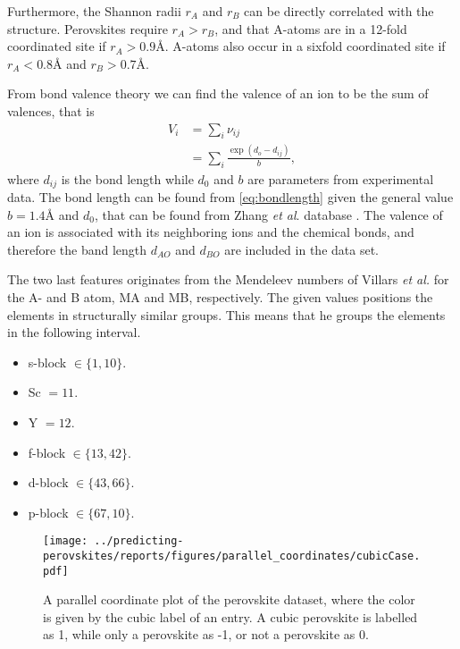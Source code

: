Furthermore, the Shannon radii $r_A$ and $r_B$ can be directly correlated with the structure. Perovskites require $r_A > r_B$, and that A-atoms are in a 12-fold coordinated site if $r_A > 0.9\text{\AA}$. A-atoms also occur in a sixfold coordinated site if $r_A < 0.8\text{\AA}$ and $r_B >0.7\text{\AA}$.

From bond valence theory we can find the valence of an ion to be the sum of valences, that is
\begin{align}
  V_i &= \sum_i \nu_{ij} \\
  &= \sum_i \frac{\exp(d_o - d_{ij})}{b} \label{eq:bondlength},
\end{align}
where $d_{ij}$ is the bond length while $d_0$ and $b$ are parameters from experimental data. The bond length can be found from \autoref{eq:bondlength} given the general value $b=1.4\text{\AA}$ and $d_0$, that can be found from Zhang \textit{et al}. database \cite{Zhang2007}. The valence of an ion is associated with its neighboring ions and the chemical bonds, and therefore the band length $d_{AO}$ and $d_{BO}$ are included in the data set.

The two last features originates from the Mendeleev numbers of Villars \textit{et al.} \cite{Villars2004} for the A- and B atom, MA and MB, respectively. The given values positions the elements in structurally similar groups. This means that he groups the elements in the following interval.

\begin{itemize}
  \item s-block $\in \{1,10\}$.
  \item Sc $ = 11$.
  \item Y  $ = 12$.
  \item f-block $\in \{13,42\}$.
  \item d-block $\in \{43,66\}$.
  \item p-block $\in \{67,10\}$.
\end{itemize}

\begin{figure}[ht!]
  \centering
  \texttt{[image: ../predicting-perovskites/reports/figures/parallel\_coordinates/cubicCase.pdf]}
  \vspace*{-130mm}
  \caption{A parallel coordinate plot of the perovskite dataset, where the color is given by the cubic label of an entry. A cubic perovskite is labelled as 1, while only a perovskite as -1, or not a perovskite as 0.}
  \label{fig:plcp}
\end{figure}

